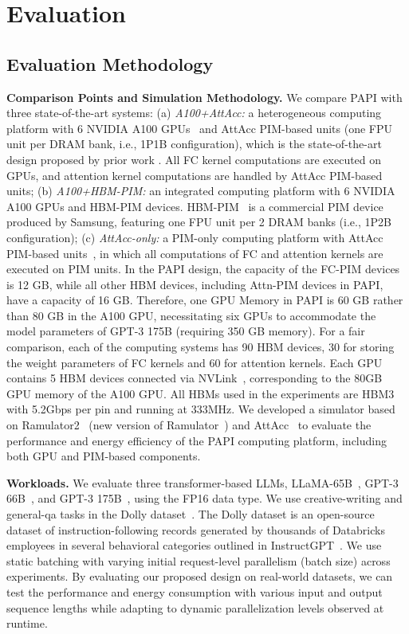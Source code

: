 

\section{Evaluation}

\subsection{Evaluation Methodology}


\textbf{Comparison Points and Simulation Methodology.} We compare PAPI with three state-of-the-art systems: (a) \emph{A100+AttAcc:} a heterogeneous computing platform with 6 NVIDIA A100 GPUs~\cite{choquette2020nvidia} and AttAcc PIM-based units (one FPU unit per DRAM bank, i.e., 1P1B configuration), which is the state-of-the-art design proposed by prior work \cite{park2024attacc}. All FC kernel computations are executed on GPUs, and attention kernel computations are handled by AttAcc PIM-based units; (b) \emph{A100+HBM-PIM:} an integrated computing platform with 6 NVIDIA A100 GPUs and HBM-PIM devices. HBM-PIM~\cite{lee2021hardware} is a commercial PIM device produced by Samsung, featuring one FPU unit per 2 DRAM banks (i.e., 1P2B configuration); (c) \emph{AttAcc-only:} a PIM-only computing platform with AttAcc PIM-based units~\cite{park2024attacc}, in which all computations of FC and attention kernels are executed on PIM units.
In the PAPI design, the capacity of the FC-PIM devices is 12 GB, while all other HBM devices, including Attn-PIM devices in PAPI, have a capacity of 16 GB. Therefore, one GPU Memory in PAPI is 60 GB rather than 80 GB in the A100 GPU, necessitating six GPUs to accommodate the model parameters of GPT-3 175B (requiring 350 GB memory).
For a fair comparison, each of the computing systems has 90 HBM devices, 30 for storing the weight parameters of FC kernels and 60 for attention kernels. Each GPU contains 5 HBM devices connected via NVLink~\cite{NVlink}, corresponding to the 80GB GPU memory of the A100 GPU.
All HBMs used in the experiments are HBM3~\cite{JEDEC} with 5.2Gbps per pin and running at 333MHz.
We developed a simulator based on Ramulator2~\cite{luo2023ramulator} (new version of Ramulator~\cite{kim2015ramulator}) and AttAcc~\cite{park2024attacc} to evaluate the performance and energy efficiency of the PAPI computing platform, including both GPU and PIM-based components. 

\noindent\textbf{Workloads.} We evaluate three transformer-based LLMs, LLaMA-65B~\cite{touvron2023llama}, GPT-3 66B~\cite{brown2020language}, and GPT-3 175B~\cite{brown2020language}, using the FP16 data type. We use creative-writing and general-qa tasks in the Dolly dataset~\cite{DatabricksBlog2023DollyV2}. The Dolly dataset is an open-source dataset of instruction-following records generated by thousands of Databricks employees in several behavioral categories outlined in InstructGPT~\cite{ouyang2022training}. We use static batching with varying initial request-level parallelism (batch size) across experiments. By evaluating our proposed design on real-world datasets, we can test the performance and energy consumption with various input and output sequence lengths while adapting to dynamic parallelization levels observed at runtime.


